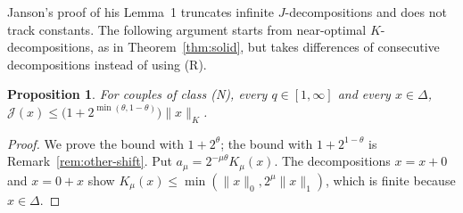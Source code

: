 \documentclass[11pt]{article}
\newtheorem{proposition}[theorem]{Proposition}
\theoremstyle{remark}
\newcommand{\norm}[2]{\lVert #1\rVert_{#2}}
\newcommand{\cJ}{\mathcal J}
\begin{document}
Janson's proof of his Lemma~1 truncates infinite \(J\)-decompositions and does not track
constants. The following argument starts from near-optimal \(K\)-decompositions, as in
Theorem~\ref{thm:solid}, but takes differences of consecutive decompositions instead of
using (R).

\begin{proposition}\label{prop:differences}
  For couples of class (N), every \(q \in [1, \infty]\) and every \(x \in \Delta\),
  \(\cJ(x) \le \bigl(1 + 2^{\min(\theta,1-\theta)}\bigr)\norm{x}{K}\).
\end{proposition}

\begin{proof}
  We prove the bound with \(1 + 2^\theta\); the bound with \(1 + 2^{1-\theta}\) is
  Remark~\ref{rem:other-shift}. Put \(a_\mu = 2^{-\mu\theta}K_\mu(x)\). The decompositions
  \(x = x + 0\) and \(x = 0 + x\) show \(K_\mu(x) \le \min(\norm{x}{0}, 2^\mu\norm{x}{1})\),
  which is finite because \(x \in \Delta\).


\end{proof}
\end{document}
